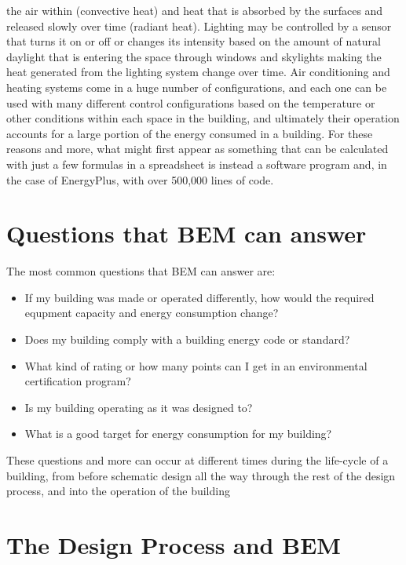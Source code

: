 the air within (convective heat) and heat that is absorbed by the
surfaces and released slowly over time (radiant heat). Lighting may
be controlled by a sensor that turns it on or off or changes its intensity
based on the amount of natural daylight that is entering the space
through windows and skylights making the heat generated from the lighting
system change over time. Air conditioning and heating systems come
in a huge number of configurations, and each one can be used with
many different control configurations based on the temperature or
other conditions within each space in the building, and ultimately
their operation accounts for a large portion of the energy consumed
in a building. For these reasons and more, what might first appear
as something that can be calculated with just a few formulas in a
spreadsheet is instead a software program and, in the case of EnergyPlus,
with over 500,000 lines of code. 

\section{Questions that BEM can answer}

The most common questions that BEM can answer are:
\begin{itemize}
\item If my building was made or operated differently, how would the required
equpment capacity and energy consumption change?
\item Does my building comply with a building energy code or standard?
\item What kind of rating or how many points can I get in an environmental
certification program?
\item Is my building operating as it was designed to?
\item What is a good target for energy consumption for my building?
\end{itemize}
These questions and more can occur at different times during the life-cycle
of a building, from before schematic design all the way through the
rest of the design process, and into the operation of the building

\section{The Design Process and BEM }

